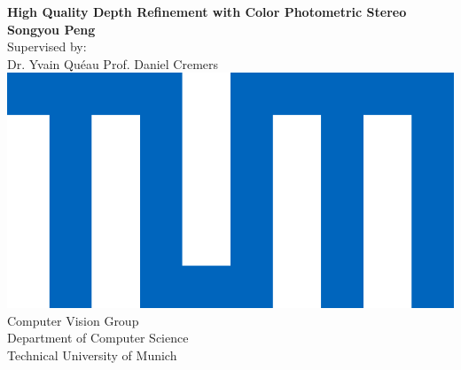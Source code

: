 
\newpage
\thispagestyle{empty}


\vspace*{-2cm}
\begin{center}
{\LARGE\bf High Quality Depth Refinement with Color Photometric Stereo\\} \vspace{2cm} {\Large \textbf{Songyou Peng}}\\
\vspace{1.5cm}
{
\large 
Supervised by:\\ \vspace{0.4cm}
 Dr. Yvain Qu\'eau \hspace{0.8cm} Prof. Daniel Cremers
}
\\\vspace{0.8cm}
{
\includegraphics[height=0.15\textheight]{figures/tum_logo.jpg}
\\\vspace{0.8cm}
\large
Computer Vision Group \\
\vspace{0.4cm}
Department of Computer Science\\
\vspace{0.4cm}
Technical University of Munich}

\end{center}

